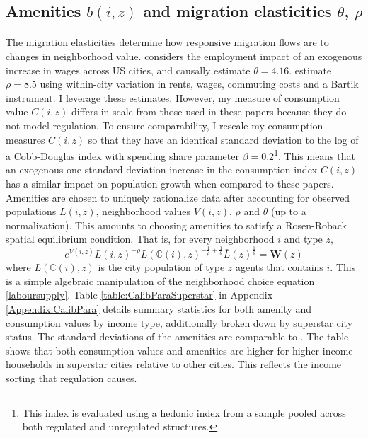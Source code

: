 \documentclass[12pt]{article}
\begin{document}
\subsection{Amenities $b(i, z)$ and migration elasticities $\theta$, $\rho$}\label{Calibration:Amenities} 
\paragraph*{}
The migration elasticities determine how responsive migration flows are to changes in neighborhood value. \cite{morettihornbeck} considers the employment impact of an exogenous increase in wages across US cities, and causally estimate $\theta = 4.16$. \cite{BSH} estimate $\rho = 8.5$ using within-city variation in rents, wages, commuting costs and a Bartik instrument. I leverage these estimates. However, my measure of consumption value $C(i, z)$ differs in scale from those used in these papers because they do not model regulation. To ensure comparability, I rescale my consumption measures $C(i, z)$ so that they have an identical standard deviation to the log of a Cobb-Douglas index with spending share parameter $\beta = 0.2$\footnote{This index is evaluated using a hedonic index from a sample pooled across both regulated and unregulated structures.}. This means that an exogenous one standard deviation increase in the consumption index $C(i, z)$ has a similar impact on population growth when compared to these papers. Amenities are chosen to uniquely rationalize data after accounting for observed populations $L(i, z)$, neighborhood values $V(i, z)$, $\rho$ and $\theta$ (up to a normalization). This amounts to choosing amenities to satisfy a Rosen-Roback spatial equilibrium condition. That is, for every neighborhood $i$ and type $z$,
\begin{equation}\label{RosenRobackCalibrate}
 e^{V(i, z)}L(i, z)^{-\rho}L(\mathbb{C}(i), z)^{-\frac{1}{\rho} + \frac{1}{\theta}}\bar{L}(z)^{\frac{1}{\theta}} = \boldsymbol{W}(z) 
\end{equation}
 where $L(\mathbb{C}(i), z)$ is the city population of type $z$ agents that contains $i$. This is a simple algebraic manipulation of the neighborhood choice equation \eqref{laboursupply}. Table \ref{table:CalibParaSuperstar} in Appendix \ref{Appendix:CalibPara} details summary statistics for both amenity and consumption values by income type, additionally broken down by superstar city status. The standard deviations of the amenities are comparable to \cite{hseihmoretti}.  The table shows that both consumption values and amenities are higher for higher income households in superstar cities relative to other cities. This reflects the income sorting that regulation causes.
\end{document}
